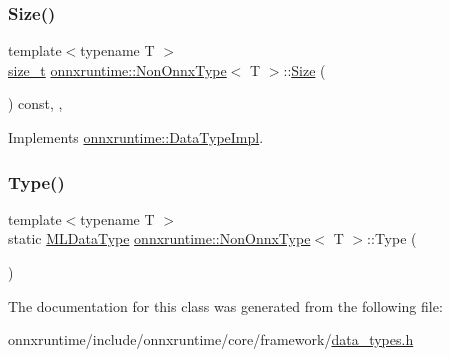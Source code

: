 \subsubsection{\texorpdfstring{Size()}{Size()}}
{\footnotesize\ttfamily template$<$typename T $>$ \\
\mbox{\hyperlink{mlasi_8h_a503efbc1c6e50825320ad909366b78ab}{size\+\_\+t}} \mbox{\hyperlink{classonnxruntime_1_1NonOnnxType}{onnxruntime\+::\+Non\+Onnx\+Type}}$<$ T $>$\+::\mbox{\hyperlink{classonnxruntime_1_1Size}{Size}} (\begin{DoxyParamCaption}{ }\end{DoxyParamCaption}) const\hspace{0.3cm}{\ttfamily [inline]}, {\ttfamily [override]}, {\ttfamily [virtual]}}



Implements \mbox{\hyperlink{classonnxruntime_1_1DataTypeImpl_a025f1d860799cd7bc187482742ce7baa}{onnxruntime\+::\+Data\+Type\+Impl}}.

\mbox{\label{classonnxruntime_1_1NonOnnxType_a40acd1095f90b416f96b54b619bc55c1}} 
\subsubsection{\texorpdfstring{Type()}{Type()}}
{\footnotesize\ttfamily template$<$typename T $>$ \\
static \mbox{\hyperlink{namespaceonnxruntime_ad77d0a6e838ec7da5dc35fed5ee66b49}{M\+L\+Data\+Type}} \mbox{\hyperlink{classonnxruntime_1_1NonOnnxType}{onnxruntime\+::\+Non\+Onnx\+Type}}$<$ T $>$\+::Type (\begin{DoxyParamCaption}{ }\end{DoxyParamCaption})\hspace{0.3cm}{\ttfamily [static]}}



The documentation for this class was generated from the following file\+:\begin{DoxyCompactItemize}
\item 
onnxruntime/include/onnxruntime/core/framework/\mbox{\hyperlink{data__types_8h}{data\+\_\+types.\+h}}\end{DoxyCompactItemize}
